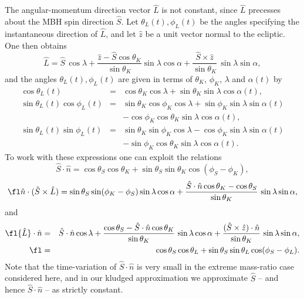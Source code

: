 \documentclass{iopart}
\def\be{\begin{equation}}
\def\ee{\end{equation}}
\def\bea{\begin{eqnarray}}
\def\eea{\end{eqnarray}}
\begin{document}
The angular-momentum direction vector $\hat L$ is not constant, since $\hat L$ precesses about the MBH spin
direction $\hat S$.  Let $\theta_L(t),\phi_L(t)$ be the angles specifying the instantaneous direction of $\hat L$, and let $\hat z$ be a unit vector normal to the ecliptic. One then obtains
\be \label{alpha}
\hat L = \hat S \, \cos\lambda +
\frac{\hat z - \hat S \cos\theta_K}{\sin\theta_K} \sin\lambda \cos\alpha
+ \frac{\hat S \times \hat z}{\sin\theta_K}  \, \sin\lambda \sin\alpha,
\ee
\noindent
and the angles $\theta_L(t),\phi_L(t)$ are given in terms of $\theta_K$, $\phi_K$, $\lambda$ and $\alpha(t)$ by
\begin{eqnarray}\label{relations3}
\cos\theta_L(t) &=& \cos\theta_K \cos\lambda
    +\sin\theta_K\sin\lambda\cos\alpha(t), \nonumber\\
\sin\theta_L(t)\cos\phi_L(t) &=&
\sin\theta_K\cos\phi_K\cos\lambda +\sin\phi_K\sin\lambda\sin\alpha(t) \nonumber \\
& & -\cos\phi_K\cos\theta_K\sin\lambda\cos\alpha(t), \\
\sin\theta_L(t)\sin\phi_L(t) &=&
\sin\theta_K\sin\phi_K\cos\lambda -\cos\phi_K\sin\lambda\sin\alpha(t) \nonumber \\
& & -\sin\phi_K\cos\theta_K\sin\lambda\cos\alpha(t). \nonumber
\end{eqnarray}
%
To work with these expressions one can exploit the relations
%
\be
\label{SdotN}
{\hat S}\cdot{ \hat n} = \cos\theta_S \cos\theta_K
+ \sin\theta_S \sin\theta_K \cos(\phi_S-\phi_K),
\ee
%
\be\label{ScrossLdotN}
\fl \hat n \cdot (\hat S \times \hat L) = 
\sin\theta_S \sin(\phi_K-\phi_S)\sin\lambda \cos\alpha + \frac{\hat S\cdot\hat n \cos\theta_K -\cos\theta_S}{\sin\theta_K} \, \sin\lambda \sin\alpha,
\ee
and
\bea
\label{LdotN}
\fl { \hat L}\cdot{ \hat n} & = & { \hat S}\cdot{ \hat n}\cos\lambda
+ \frac{\cos\theta_S - \hat S\cdot\hat n \cos\theta_K}{\sin\theta_K}
\, \sin\lambda \cos\alpha + \frac{(\hat S \times \hat z)\cdot \hat n}
{\sin\theta_K}  \, \sin\lambda \sin\alpha, \nonumber \\
\fl & = & \cos\theta_S \cos\theta_L +
\sin\theta_S \sin\theta_L \cos(\phi_S-\phi_L).
\eea
%
Note that the time-variation of $\hat{S}\cdot\hat{n}$ is very small in the extreme mass-ratio case considered here, and in our kludged approximation we approximate $\hat S$ -- and hence ${\hat S}\cdot{\hat n}$ -- as strictly constant.
\end{document}
